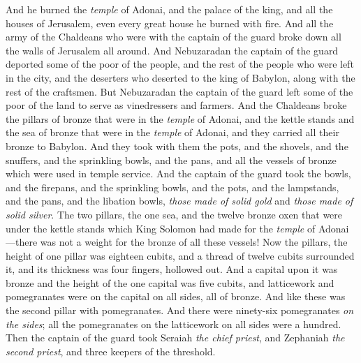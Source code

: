 \begin{biblechapter}
\verse And he burned the \textit{temple} of Adonai, and the palace of the king, and all the houses of Jerusalem, even every great house he burned with fire.
\verse And all the army of the Chaldeans who were with the captain of the guard broke down all the walls of Jerusalem all around.
\verse And Nebuzaradan the captain of the guard deported some of the poor of the people, and the rest of the people who were left in the city, and the deserters who deserted to the king of Babylon, along with the rest of the craftsmen.
\verse But Nebuzaradan the captain of the guard left some of the poor of the land to serve as vinedressers and farmers.
\verse And the Chaldeans broke the pillars of bronze that were in the \textit{temple} of Adonai, and the kettle stands and the sea of bronze that were in the \textit{temple} of Adonai, and they carried all their bronze to Babylon.
\verse And they took with them the pots, and the shovels, and the snuffers, and the sprinkling bowls, and the pans, and all the vessels of bronze which were used in temple service.
\verse And the captain of the guard took the bowls, and the firepans, and the sprinkling bowls, and the pots, and the lampstands, and the pans, and the libation bowls, \textit{those made of solid gold} and \textit{those made of solid silver}.
\verse The two pillars, the one sea, and the twelve bronze oxen that were under the kettle stands which King Solomon had made for the \textit{temple} of Adonai—there was not a weight for the bronze of all these vessels!
\verse Now the pillars, the height of one pillar was eighteen cubits, and a thread of twelve cubits surrounded it, and its thickness was four fingers, hollowed out.
\verse And a capital upon it was bronze and the height of the one capital was five cubits, and latticework and pomegranates were on the capital on all sides, all of bronze. And like these was the second pillar with pomegranates.
\verse And there were ninety-six pomegranates \textit{on the sides}; all the pomegranates on the latticework on all sides were a hundred.
\verse Then the captain of the guard took Seraiah \textit{the chief priest}, and Zephaniah \textit{the second priest}, and three keepers of the threshold.

\end{biblechapter}
